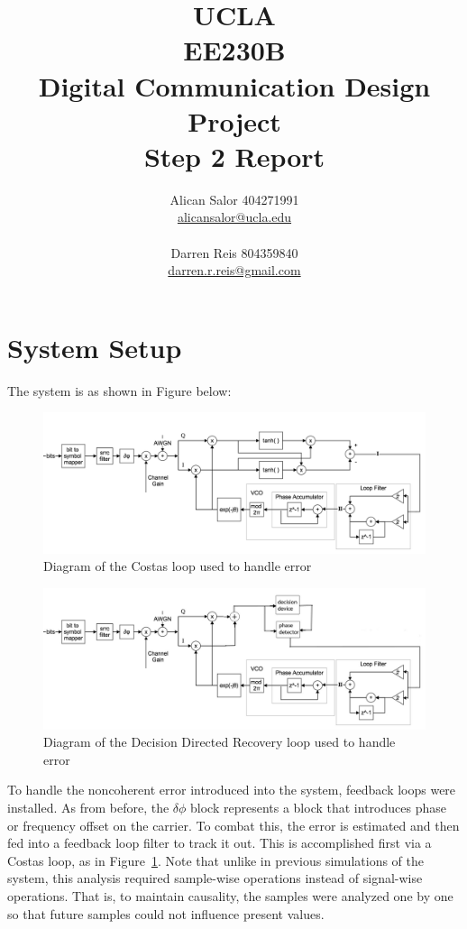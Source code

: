 \documentclass[]{article}
\title{UCLA\\EE230B\\Digital Communication Design Project\\Step 2 Report}
\author{Alican Salor 404271991 \\  \href{mailto:alicansalor@ucla.edu}{alicansalor@ucla.edu} \\ \\
Darren Reis 804359840 \\
\href{mailto:darrer.r.reis@gmail.com}{darren.r.reis@gmail.com} }
\begin{document}
\maketitle

\newpage
\tableofcontents

\newpage


\section{System Setup}
\label{sec:setup}
The system is as shown in Figure below:

\begin{figure}[H]
\centering
\includegraphics[width=\textwidth]{costas.png}
\caption{Diagram of the Costas loop used to handle error\label{fig:costas}}
\end{figure}

\begin{figure}[H]
\centering
\includegraphics[width=\textwidth]{ddr_diagram.jpg}
\caption{Diagram of the Decision Directed Recovery loop used to handle error}
\end{figure}


To handle the noncoherent error introduced into the system, feedback loops were installed.  As from before, the $\delta\phi$ block represents a block that introduces phase or frequency offset on the carrier.  To combat this, the error is estimated and then fed into a feedback loop filter to track it out.  This is accomplished first via a Costas loop, as in Figure~\ref{fig:costas}.  Note that unlike in previous simulations of the system, this analysis required sample-wise operations instead of signal-wise operations.  That is, to maintain causality, the samples were analyzed one by one so that future samples could not influence present values.
\end{document}

